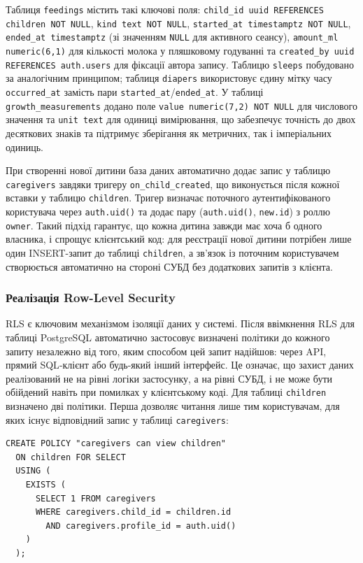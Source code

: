 Таблиця \texttt{feedings} містить такі ключові поля: \texttt{child\_id uuid REFERENCES children NOT NULL}, \texttt{kind text NOT NULL}, \texttt{started\_at timestamptz NOT NULL}, \texttt{ended\_at timestamptz} (зі значенням \texttt{NULL} для активного сеансу), \texttt{amount\_ml numeric(6,1)} для кількості молока у пляшковому годуванні та \texttt{created\_by uuid REFERENCES auth.users} для фіксації автора запису. Таблицю \texttt{sleeps} побудовано за аналогічним принципом; таблиця \texttt{diapers} використовує єдину мітку часу \texttt{occurred\_at} замість пари \texttt{started\_at}/\texttt{ended\_at}. У таблиці \texttt{growth\_measurements} додано поле \texttt{value numeric(7,2) NOT NULL} для числового значення та \texttt{unit text} для одиниці вимірювання, що забезпечує точність до двох десяткових знаків та підтримує зберігання як метричних, так і імперіальних одиниць.

При створенні нової дитини база даних автоматично додає запис у таблицю \texttt{caregivers} завдяки тригеру \texttt{on\_child\_created}, що виконується після кожної вставки у таблицю \texttt{children}. Тригер визначає поточного аутентифікованого користувача через \texttt{auth.uid()} та додає пару (\texttt{auth.uid()}, \texttt{new.id}) з роллю \texttt{owner}. Такий підхід гарантує, що кожна дитина завжди має хоча б одного власника, і спрощує клієнтський код: для реєстрації нової дитини потрібен лише один INSERT-запит до таблиці \texttt{children}, а зв'язок із поточним користувачем створюється автоматично на стороні \gls{СУБД} без додаткових запитів з клієнта.

\subsubsection{Реалізація Row-Level Security}
\label{sec:rls}

\gls{RLS} є ключовим механізмом ізоляції даних у системі. Після ввімкнення \gls{RLS} для таблиці PostgreSQL автоматично застосовує визначені політики до кожного запиту незалежно від того, яким способом цей запит надійшов: через \gls{API}, прямий \gls{SQL}-клієнт або будь-який інший інтерфейс. Це означає, що захист даних реалізований не на рівні логіки застосунку, а на рівні \gls{СУБД}, і не може бути обійдений навіть при помилках у клієнтському коді. Для таблиці \texttt{children} визначено дві політики. Перша дозволяє читання лише тим користувачам, для яких існує відповідний запис у таблиці \texttt{caregivers}:

\begin{verbatim}
CREATE POLICY "caregivers can view children"
  ON children FOR SELECT
  USING (
    EXISTS (
      SELECT 1 FROM caregivers
      WHERE caregivers.child_id = children.id
        AND caregivers.profile_id = auth.uid()
    )
  );
\end{verbatim}

